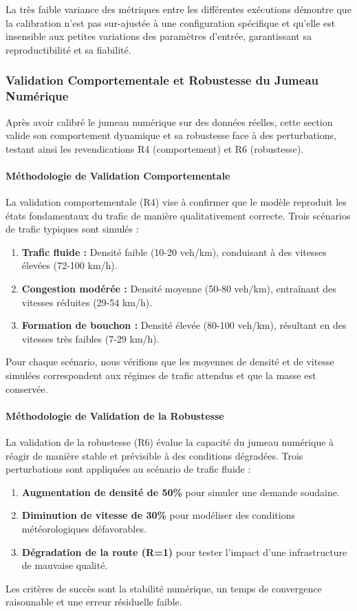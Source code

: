 La très faible variance des métriques entre les différentes exécutions démontre que la
calibration n'est pas sur-ajustée à une configuration spécifique et qu'elle est insensible aux petites variations des paramètres d'entrée,
garantissant sa reproductibilité et sa fiabilité.

\subsubsection{Validation Comportementale et Robustesse du Jumeau Numérique}
\label{subsec:validation_comportementale_robustesse}

Après avoir calibré le jumeau numérique sur des données réelles, cette section valide son comportement dynamique et sa robustesse face à des perturbations, testant ainsi les revendications R4 (comportement) et R6 (robustesse).

\paragraph{Méthodologie de Validation Comportementale}

La validation comportementale (R4) vise à confirmer que le modèle reproduit les états fondamentaux du trafic de manière qualitativement correcte. Trois scénarios de trafic typiques sont simulés :
\begin{enumerate}
    \item \textbf{Trafic fluide :} Densité faible (10-20 veh/km), conduisant à des vitesses élevées (72-100 km/h).
    \item \textbf{Congestion modérée :} Densité moyenne (50-80 veh/km), entraînant des vitesses réduites (29-54 km/h).
    \item \textbf{Formation de bouchon :} Densité élevée (80-100 veh/km), résultant en des vitesses très faibles (7-29 km/h).
\end{enumerate}
Pour chaque scénario, nous vérifions que les moyennes de densité et de vitesse simulées correspondent aux régimes de trafic attendus et que la masse est conservée.

\paragraph{Méthodologie de Validation de la Robustesse}

La validation de la robustesse (R6) évalue la capacité du jumeau numérique à réagir de manière stable et prévisible à des conditions dégradées. Trois perturbations sont appliquées au scénario de trafic fluide :
\begin{enumerate}
    \item \textbf{Augmentation de densité de 50\%} pour simuler une demande soudaine.
    \item \textbf{Diminution de vitesse de 30\%} pour modéliser des conditions météorologiques défavorables.
    \item \textbf{Dégradation de la route (R=1)} pour tester l'impact d'une infrastructure de mauvaise qualité.
\end{enumerate}
Les critères de succès sont la stabilité numérique, un temps de convergence raisonnable et une erreur résiduelle faible.

